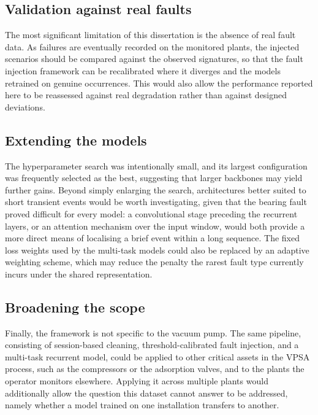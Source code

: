 \subsection*{Validation against real faults}

The most significant limitation of this dissertation is the absence of real fault data. As failures are
eventually recorded on the monitored plants, the injected scenarios should be compared against the
observed signatures, so that the fault injection framework can be recalibrated where it diverges and the
models retrained on genuine occurrences. This would also allow the performance reported here to be
reassessed against real degradation rather than against designed deviations.

\subsection*{Extending the models}

The hyperparameter search was intentionally small, and its largest configuration was frequently selected
as the best, suggesting that larger backbones may yield further gains. Beyond simply enlarging the search,
architectures better suited to short transient events would be worth investigating, given that the bearing
fault proved difficult for every model: a convolutional stage preceding the recurrent layers, or an
attention mechanism over the input window, would both provide a more direct means of localising a brief
event within a long sequence. The fixed loss weights used by the multi-task models could also be replaced
by an adaptive weighting scheme, which may reduce the penalty the rarest fault type currently incurs under
the shared representation.

\subsection*{Broadening the scope}

Finally, the framework is not specific to the vacuum pump. The same pipeline, consisting of session-based
cleaning, threshold-calibrated fault injection, and a multi-task recurrent model, could be applied to other
critical assets in the VPSA process, such as the compressors or the adsorption valves, and to the plants
the operator monitors elsewhere. Applying it across multiple plants would additionally allow the question
this dataset cannot answer to be addressed, namely whether a model trained on one installation transfers
to another.